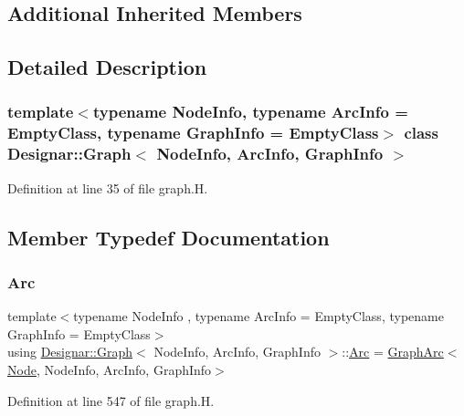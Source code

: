 \subsection*{Additional Inherited Members}


\subsection{Detailed Description}
\subsubsection*{template$<$typename Node\+Info, typename Arc\+Info = Empty\+Class, typename Graph\+Info = Empty\+Class$>$\newline
class Designar\+::\+Graph$<$ Node\+Info, Arc\+Info, Graph\+Info $>$}



Definition at line 35 of file graph.\+H.



\subsection{Member Typedef Documentation}
\mbox{\label{class_designar_1_1_graph_a74c730ef4ce2d20f998d72bd25c2b5bf}} 
\subsubsection{\texorpdfstring{Arc}{Arc}}
{\footnotesize\ttfamily template$<$typename Node\+Info , typename Arc\+Info  = Empty\+Class, typename Graph\+Info  = Empty\+Class$>$ \\
using \hyperlink{class_designar_1_1_graph}{Designar\+::\+Graph}$<$ Node\+Info, Arc\+Info, Graph\+Info $>$\+::\hyperlink{class_designar_1_1_graph_a74c730ef4ce2d20f998d72bd25c2b5bf}{Arc} =  \hyperlink{class_designar_1_1_graph_arc}{Graph\+Arc}$<$\hyperlink{class_designar_1_1_graph_a5dfc7dba9d092ac489c72e40390c37d0}{Node}, Node\+Info, Arc\+Info, Graph\+Info$>$}



Definition at line 547 of file graph.\+H.

\mbox{\label{class_designar_1_1_graph_abc2adb4841a6d092d5093f9e60f2c8be}} 
